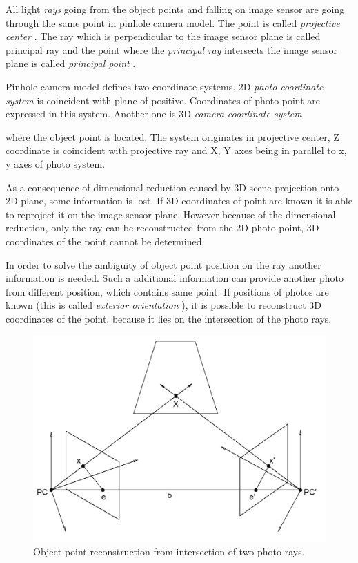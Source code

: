 \documentclass[a4paper,12pt]{article}
\newcommand{\term}[1]{
{\it #1}
}
\begin{document}

All light \term{rays} going from the object points and falling on image sensor are going through the same point in pinhole camera model.
The point is called \term{projective center}. The ray which is perpendicular to the image sensor plane is called principal ray and the point 
where the \term{principal ray} intersects the image sensor plane is called \term{principal point}.

Pinhole camera model defines two coordinate systems. 2D  \term{photo coordinate system} is coincident
with plane of positive.
Coordinates of photo point are expressed in this system. Another one is 3D \term{camera coordinate system}
where the object point is located. The system originates in projective center, Z coordinate 
 is coincident with projective ray and X, Y axes being in parallel to x, y axes of photo system.

 
As a consequence of dimensional reduction caused by 
3D scene projection onto 2D plane, some information is lost.
If 3D coordinates of point are known it is able to reproject it on the image sensor plane. However because 
of the dimensional reduction,  only the ray can be reconstructed from the 2D photo point,
3D coordinates of the point cannot be determined.
 
In order to solve the ambiguity of object point position on the ray another information is needed.  
Such a additional information can provide another photo from different position, which contains same point. 
If positions of photos 
 are known (this is called \term{exterior orientation}), it is possible 
to reconstruct 3D coordinates of the point, because it lies on the intersection of the photo rays.


\begin{figure}[h]
    \centering
    \includegraphics[scale=0.2]{figures/object_point_intersection.png}
    \caption{Object point reconstruction from intersection of two photo rays.}
    \label{fig:obj_intersec}
\end{figure}
\end{document}
